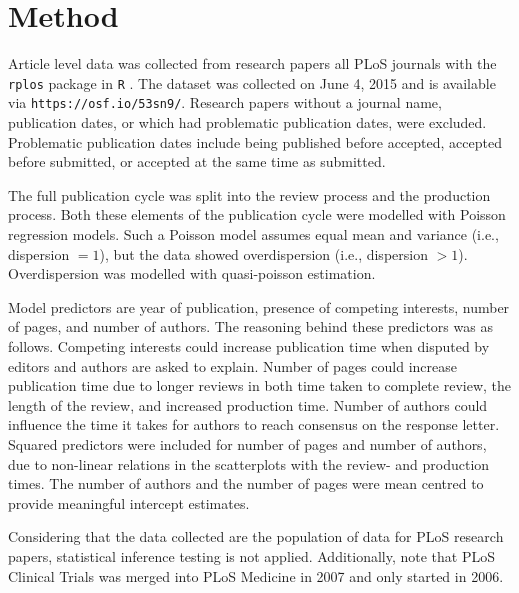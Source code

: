 \section*{Method}
Article level data was collected from research papers all PLoS journals with the \texttt{rplos} package \cite[v0.4.7][]{rplos} in \texttt{R} \cite[v3.2.0][]{rcran}. The dataset was collected on June 4, 2015 and is available via \texttt{https://osf.io/53sn9/}. Research papers without a journal name, publication dates, or which had problematic publication dates, were excluded. Problematic publication dates include being published before accepted, accepted before submitted, or accepted at the same time as submitted.

The full publication cycle was split into the review process and the production process. Both these elements of the publication cycle were modelled with Poisson regression models. Such a Poisson model assumes equal mean and variance (i.e., dispersion $=1$), but the data showed overdispersion (i.e., dispersion $>1$). Overdispersion was modelled with quasi-poisson estimation.

Model predictors are year of publication, presence of competing interests, number of pages, and number of authors. The reasoning behind these predictors was as follows. Competing interests could increase publication time when disputed by editors and authors are asked to explain. Number of pages could increase publication time due to longer reviews in both time taken to complete review, the length of the review, and increased production time. Number of authors could influence the time it takes for authors to reach consensus on the response letter. Squared predictors were included for number of pages and number of authors, due to non-linear relations in the scatterplots with the review- and production times. The number of authors and the number of pages were mean centred to provide meaningful intercept estimates.

Considering that the data collected are the population of data for PLoS research papers, statistical inference testing is not applied. Additionally, note that PLoS Clinical Trials was merged into PLoS Medicine in 2007 and only started in 2006.
